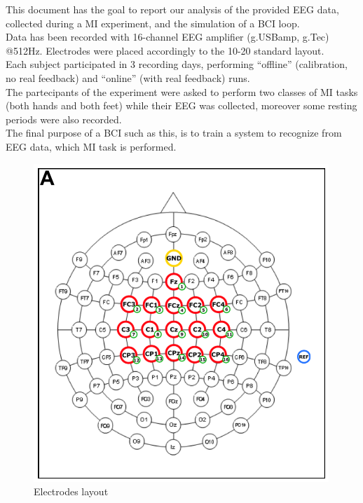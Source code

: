 This document has the goal to report our analysis of the provided EEG data, collected during a MI experiment, and the simulation of a BCI loop. \\
Data has been recorded with 16-channel EEG amplifier (g.USBamp, g.Tec) @512Hz. Electrodes were placed accordingly to the 10-20 standard layout. \\
Each subject participated in 3 recording days, performing  “offline” (calibration, no real feedback) and  “online” (with real feedback) runs. \\
The partecipants of the experiment were asked to perform two classes of MI tasks (both hands and both feet) while their EEG was collected, moreover some resting periods were also recorded.\\
The final purpose of a BCI such as this, is to train a system to recognize from EEG data, which MI task is performed.

\begin{figure}[h!]
	\begin{center}
		 \includegraphics[width=0.4\linewidth]{img/electrodes_layout.PNG}
	\end{center}

	 \caption{Electrodes layout}
	 \label{fig:electrodes_layout}
\end{figure}